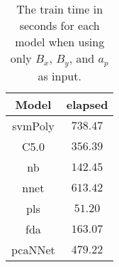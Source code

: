 \begin{table}[!ht]
	\centering
	\begin{tabular}{|c|c|}
		\hline
		Model & elapsed \\ \hline
		svmPoly & $738.47$ \\ \hline
		C5.0 & $356.39$ \\ \hline
		nb & $142.45$ \\ \hline
		nnet & $613.42$ \\ \hline
		pls & $51.20$ \\ \hline
		fda & $163.07$ \\ \hline
		pcaNNet & $479.22$ \\ \hline
	\end{tabular}
	\caption{The train time in seconds for each model when using only $B_{x}$, $B_{y}$, and $a_{p}$ as input.}
	\label{tab:time:xyap:train}
\end{table}
